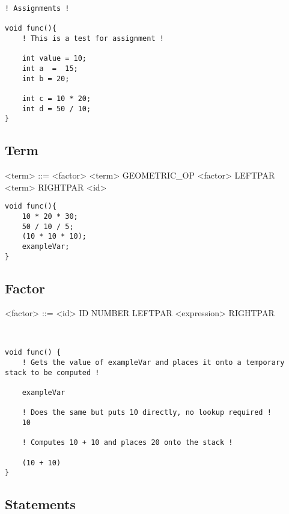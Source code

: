 \documentclass{article}
\begin{document}
\begin{lstlisting}[style=CStyle]
! Assignments !

void func(){
    ! This is a test for assignment !

    int value = 10;
    int a  =  15;
    int b = 20;

    int c = 10 * 20;
    int d = 50 / 10;
}
\end{lstlisting}

\newpage

\subsection{Term}

\begin{grammar}
<term> ::= <factor>
\alt <term> GEOMETRIC\_OP <factor>
\alt LEFTPAR <term> RIGHTPAR
\alt <id>
\end{grammar}

\begin{lstlisting}[style=CStyle]
void func(){
    10 * 20 * 30;
    50 / 10 / 5;
    (10 * 10 * 10);
    exampleVar;
}
\end{lstlisting}


\subsection{Factor}

\begin{grammar}
<factor> ::= <id> ID
\alt NUMBER
\alt LEFTPAR <expression> RIGHTPAR

\end{grammar}

\begin{lstlisting}[style=CStyle]


void func() {
    ! Gets the value of exampleVar and places it onto a temporary stack to be computed ! 

    exampleVar

    ! Does the same but puts 10 directly, no lookup required !
    10

    ! Computes 10 + 10 and places 20 onto the stack !

    (10 + 10)
}
\end{lstlisting}

\newpage

\subsection{Statements}
\end{document}
